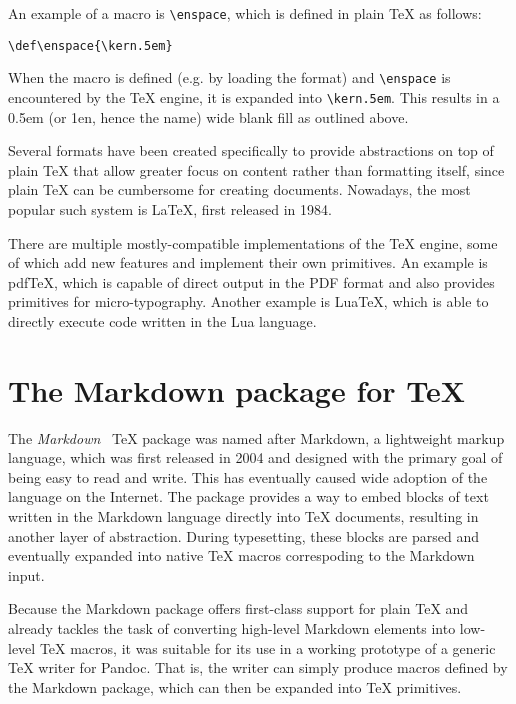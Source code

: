 \documentclass[
  digital,     %
  oneside,     %
  nosansbold,  %
  nocolorbold, %
  lof,         %
  nolot,       %
]{fithesis4}
\newcommand\macro[1]{\texttt{\textbackslash{}{#1}}}
\begin{document}
An example of a macro is \macro{enspace}, which is defined in plain \TeX{} as follows:

\noindent
\lstset{language=[plain]TeX}
\begin{lstlisting}
\def\enspace{\kern.5em}
\end{lstlisting}

When the macro is defined (e.g. by loading the format) and \macro{enspace} is encountered by the \TeX{} engine, it is expanded into \macro{kern.5em}. This results in a 0.5em (or 1en, hence the name) wide blank fill as outlined above.

Several formats have been created specifically to provide abstractions on top of plain \TeX{} that allow greater focus on content rather than formatting itself, since plain \TeX{} can be cumbersome for creating documents. Nowadays, the most popular such system is \LaTeX{}, first released in 1984.

There are multiple mostly-compatible implementations of the \TeX{} engine, some of which add new features and implement their own primitives. An example is pdf\TeX{}, which is capable of direct output in the PDF format and also provides primitives for micro-typography. Another example is Lua\TeX{}, which is able to directly execute code written in the Lua language.

\section{The Markdown package for \TeX{}}
The \emph{Markdown}~\cite{cstug-markdown} \TeX{} package was named after Markdown, a lightweight markup language, which was first released in 2004 and designed with the primary goal of being easy to read and write. This has eventually caused wide adoption of the language on the Internet. The package provides a way to embed blocks of text written in the Markdown language directly into \TeX{} documents, resulting in another layer of abstraction. During typesetting, these blocks are parsed and eventually expanded into native \TeX{} macros correspoding to the Markdown input. 

Because the Markdown package offers first-class support for plain \TeX{} and already tackles the task of converting high-level Markdown elements into low-level \TeX{} macros, it was suitable for its use in a working prototype of a generic \TeX{} writer for Pandoc. That is, the writer can simply produce macros defined by the Markdown package, which can then be expanded into \TeX{} primitives.
\end{document}
